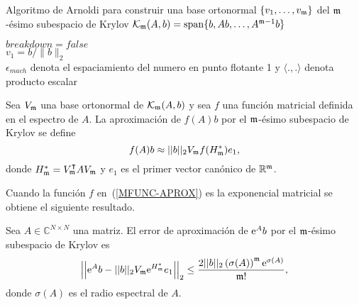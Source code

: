 \begin{algorithm}
    \caption{Algoritmo de Arnoldi para construir una base ortonormal $\{ v_1,\ldots,v_{\mathfrak{m}} \}$ del $\mathfrak{m}$-ésimo subespacio de Krylov $\mathcal{K}_{\mathfrak{m}}(A,b)=\mathrm{span} \{ b,Ab,\ldots, A^{\mathfrak{m}-1}b \}$}
    \label{alg:Arnoldi}

    $breakdown=false$\\
    $v_1=b/\lVert b \rVert_2$\\
\nonl $\epsilon_{mach}$ denota el espaciamiento del numero en punto flotante 1 y $\langle . , .\rangle$ denota producto escalar
\end{algorithm}


\begin{definition}
    \cite{Saad92} Sea $V_{\mathfrak{m}}$ una base ortonormal de $\mathcal{K}_{\mathfrak{m}}(A,b)$ y sea $f$ una función matricial definida
    en el espectro de $A$. La aproximación de $f(A)b$ por el  $\mathfrak{m}$-ésimo subespacio de Krylov se define
    \begin{equation}
        f(A)b\approx ||b||_2 V_{\mathfrak{m}} f(H^*_{\mathfrak{m}})e_1, \label{MFUNC-APROX}
    \end{equation}
    donde $H_{\mathfrak{m}}^*=V_{\mathfrak{m}}^{\intercal}AV_{\mathfrak{m}}$ y $e_1$ es el primer vector canónico de $\mathbb{R}^{\mathfrak{m}}$.
\end{definition}
Cuando la función $f$ en~(\ref{MFUNC-APROX}) es la exponencial matricial se obtiene el siguiente resultado.
\begin{theorem}\label{exp-bound}
	\cite{Saad92} Sea $A\in\mathbb{C}^{N\times N}$ una matriz. El error de aproximación de $\mathrm{e}^{A}b$ por el $\mathfrak{m}$-ésimo subespacio
	de Krylov es
	\begin{equation*}
	\left\lvert\left\lvert \mathrm{e}^{A}b - \lvert\lvert b \rvert\rvert_2 V_{\mathfrak{m}}\mathrm{e}^{H^*_{\mathfrak{m}}}e_1 \right\rvert\right\rvert_2 
	\leq \frac{2\vert\lvert b \rvert\rvert_2 \left( \sigma(A) \right)^{\mathfrak{m}}\mathrm{e}^{\sigma(A)}}{\mathfrak{m}!},
	\end{equation*}
	donde $\sigma(A)$ es el radio espectral de $A$.
\end{theorem}

